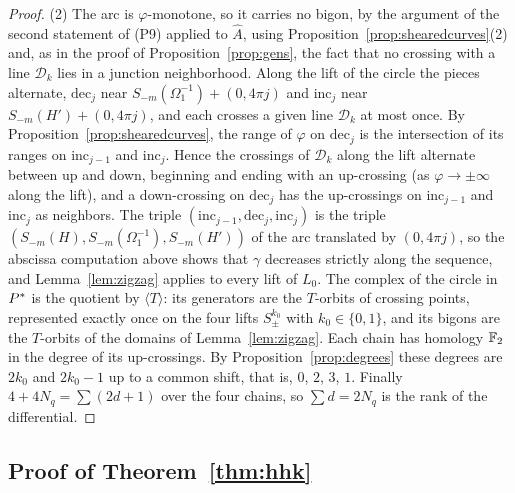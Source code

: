 \begin{proof}
(2) The arc is $\varphi$-monotone, so it carries no bigon, by the argument of the second statement of (P9) applied to $\hat A$, using Proposition~\ref{prop:shearedcurves}(2) and, as in the proof of Proposition~\ref{prop:gens}, the fact that no crossing with a line $\mathcal D_k$ lies in a junction neighborhood. Along the lift of the circle the pieces
alternate, $\mathrm{dec}_j$ near $S_{-m}(\Omega_1^{-1})+(0,4\pi j)$ and $\mathrm{inc}_j$ near $S_{-m}(H')+(0,4\pi j)$, and each crosses a given line
$\mathcal D_k$ at most once. By Proposition~\ref{prop:shearedcurves}, the range of $\varphi$ on $\mathrm{dec}_j$ is the intersection of its
ranges on $\mathrm{inc}_{j-1}$ and $\mathrm{inc}_j$. Hence the crossings of $\mathcal D_k$ along the lift alternate between up and down,
beginning and ending with an up-crossing (as $\varphi\to\pm\infty$ along the lift), and a down-crossing on $\mathrm{dec}_j$ has the
up-crossings on $\mathrm{inc}_{j-1}$ and $\mathrm{inc}_j$ as neighbors. The triple $(\mathrm{inc}_{j-1},\mathrm{dec}_j,\mathrm{inc}_j)$ is the triple
$(S_{-m}(H),S_{-m}(\Omega_1^{-1}),S_{-m}(H'))$ of the arc translated by $(0,4\pi j)$, so the abscissa computation above shows that $\gamma$
decreases strictly along the sequence, and Lemma~\ref{lem:zigzag} applies to every lift of $L_0$. The complex of the circle in
$P^{*}$ is the quotient by $\langle T\rangle$: its generators are the $T$-orbits of crossing points, represented exactly once on the
four lifts $S^{k_0}_\pm$ with $k_0\in\{0,1\}$, and its bigons are the $T$-orbits of the domains of Lemma~\ref{lem:zigzag}.
Each chain has homology $\mathbb{F}_2$ in the degree of its up-crossings. By Proposition~\ref{prop:degrees} these degrees are
$2k_0$ and $2k_0-1$ up to a common shift, that is, $0$, $2$, $3$, $1$. Finally $4+4N_q=\sum(2d+1)$ over the four chains,
so $\sum d=2N_q$ is the rank of the differential.
\end{proof}

\subsection{Proof of Theorem~\ref{thm:hhk}}\label{ss:proof-hhk}

